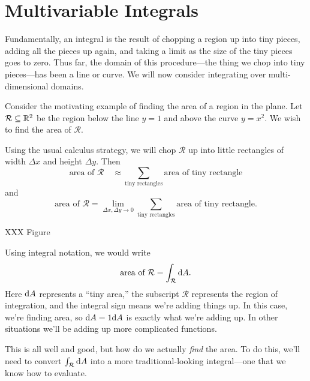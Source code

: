 \section{Multivariable Integrals}

Fundamentally, an integral is the result of chopping a region up into tiny
pieces, adding all the pieces up again, and taking a limit as the size of
the tiny pieces goes to zero.  Thus far, the domain of this procedure---the
thing we chop into tiny pieces---has been a line or curve.  We will now consider
integrating over multi-dimensional domains.

Consider the motivating example of finding the area of a region in the plane.
Let $\mathcal R\subseteq \mathbb{R}^2$ be the region below the line $y=1$ and above the
curve $y=x^2$.  We wish to find the area of $\mathcal R$.

Using the usual calculus strategy, we will chop $\mathcal R$ up into little rectangles
of width $\Delta x$ and height $\Delta y$.  Then
\[
	\text{area of }\mathcal R \quad\approx \sum_{\text{tiny rectangles}}\text{area of tiny rectangle}
\]
and
\[
	\text{area of }\mathcal R =\lim_{\Delta x,\Delta y\to 0} \sum_{\text{tiny rectangles}}\text{area of tiny rectangle}.
\]

XXX Figure

Using integral notation, we would write
\[
	\text{area of }\mathcal R=\int_{\mathcal R} \mathrm{d} A.
\]
Here $\mathrm{d} A$ represents a ``tiny area,'' the subscript $\mathcal R$ represents the region of integration,
and the integral sign means we're adding things up.  In this case, we're finding area, so $\mathrm{d} A=1\mathrm{d} A$ is
exactly what we're adding up.  In other situations we'll be adding up more complicated functions.

This is all well and good, but how do we actually \emph{find} the area.  To do this, we'll
need to convert $\int_{\mathcal R}\mathrm{d} A$ into a more traditional-looking integral---one that we
know how to evaluate.

